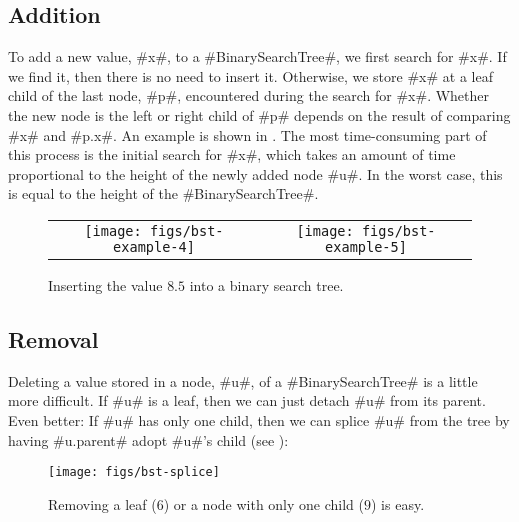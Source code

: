 \subsection{Addition}

To add a new value, #x#, to a #BinarySearchTree#, we first search for
#x#. If we find it, then there is no need to insert it.  Otherwise,
we store #x# at a leaf child of the last node, #p#, encountered during the
search for #x#. Whether the new node is the left or right child of #p# depends on the result of comparing #x# and #p.x#.
An example is shown in . The most time-consuming
part of this process is the initial search for #x#, which takes an
amount of time proportional to the height of the newly added node #u#.
In the worst case, this is equal to the height of the #BinarySearchTree#.


\begin{figure}
  \begin{center}
    \begin{tabular}{cc}
    \texttt{[image: figs/bst-example-4]} &
    \texttt{[image: figs/bst-example-5]} 
    \end{tabular}
  \end{center}
  \caption{Inserting the value $8.5$ into a binary search tree.}
\end{figure}


\subsection{Removal}

Deleting a value stored in a node, #u#, of a #BinarySearchTree# is a
little more difficult.  If #u# is a leaf, then we can just detach #u#
from its parent.  Even better: If #u# has only one child, then we can
splice #u# from the tree by having #u.parent# adopt #u#'s child (see
):

\begin{figure}
  \begin{center}
    \texttt{[image: figs/bst-splice]}
  \end{center}
  \caption{Removing a leaf ($6$) or a node with only one child ($9$) is easy.}
\end{figure}

